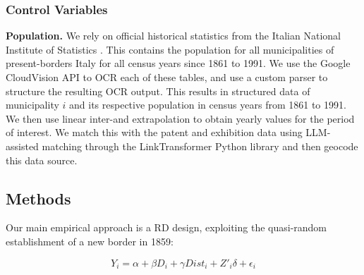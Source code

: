 \subsubsection{Control Variables}

\textbf{Population.} We rely on official historical statistics from the Italian National Institute of Statistics \citep{istat1994comuni}. 
This contains the population for all municipalities of present-borders Italy for all census years since 1861 to 1991.%
We use the Google CloudVision API \citep{googlecloudvision} to OCR each of these tables, and use a custom parser to structure the resulting OCR output. 
This results in structured data of municipality $i$ and its respective population in census years from 1861 to 1991. 
We then use linear inter-and extrapolation to obtain yearly values for the period of interest. 
We match this with the patent and exhibition data using LLM-assisted matching through the LinkTransformer Python library \citep{arora2023linktransformer} and then geocode this data source.%

\subsection{Methods}

Our main empirical approach is a RD design, exploiting the quasi-random establishment of a new border in 1859: 

\begin{equation}\label{eq:rd}
    Y_{i} = \alpha + \beta D_i + \gamma Dist_i + Z'_{i} \delta + \epsilon_i 
\end{equation}

